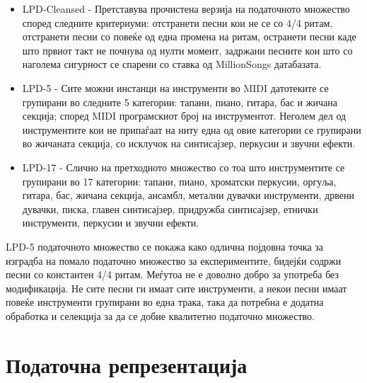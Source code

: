\begin{itemize}
    \item LPD-Cleansed - Претставува прочистена верзија на податочното множество според следните критериуми: отстранети песни кои не се со 4/4 ритам, отстранети песни со повеќе од една промена на ритам, остранети песни каде што првиот такт не почнува од нулти момент, задржани песните кои што со наголема сигурност се спарени со ставка од MillionSongs датабазата.
    \item LPD-5 - Сите можни инстанци на инструменти во MIDI датотеките се групирани во следните 5 категории: тапани, пиано, гитара, бас и жичана секција; според MIDI програмскиот број на инструментот. Неголем дел од инструментите кои не припаѓаат на ниту една од овие категории се групирани во жичаната секција, со исклучок на синтисајзер, перкусии и звучни ефекти.
    \item LPD-17 - Слично на претходното множество со тоа што инструментите се групирани во 17 категории: тапани, пиано, хроматски перкусии, оргуља, гитара, бас, жичана секција, ансамбл, метални дувачки инструменти, дрвени дувачки, писка, главен синтисајзер, придружба синтисајзер, етнички инструменти, перкусии и звучни ефекти.
\end{itemize}

LPD-5 податочното множество се покажа како одлична појдовна точка за изградба на помало податочно множество за експериментите, бидејќи содржи песни со константен 4/4 ритам. Меѓутоа не е доволно добро за употреба без модификација. Не сите песни ги имаат сите инструменти, а некои песни имаат повеќе инструменти групирани во една трака, така да потребна е додатна обработка и селекција за да се добие квалитетно податочно множество.

\section{Податочна репрезентација}

